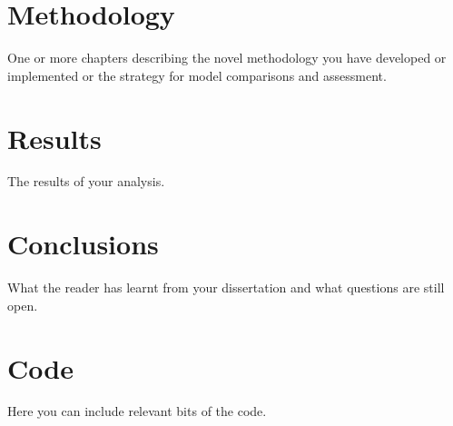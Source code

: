\documentclass[12pt,a4paper]{report}
\begin{document}
\chapter{Methodology}
One or more chapters describing the novel methodology you have developed or implemented or the strategy for model comparisons and assessment. 


\chapter{Results}
The results of your analysis.

\chapter{Conclusions}
What the reader has learnt from your dissertation and what questions are still open.

\appendix
\chapter{Code}
\label{appendix:code}
Here you can include relevant bits of the code.




\end{document}
